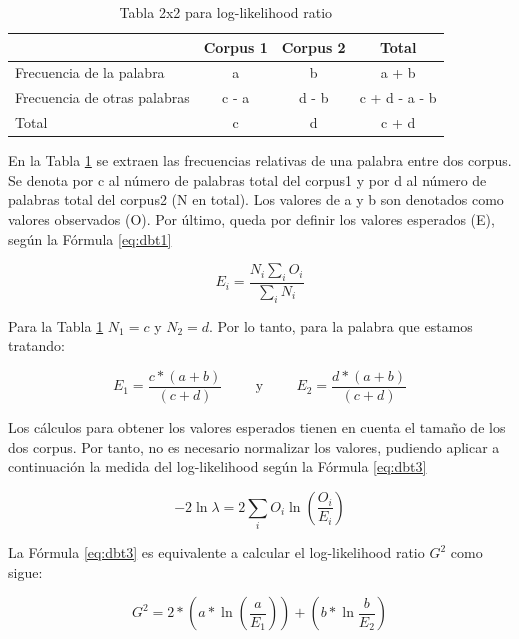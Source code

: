 \begin{table}
  \centering
  \begin{tabular}{|l|c|c|c|}
    \hline
     & Corpus 1 & Corpus 2 & Total \\
    \hline
    Frecuencia de la palabra & a & b & a + b \\
    \hline
    Frecuencia de otras palabras & c - a & d - b & c + d - a - b \\
    \hline
    Total & c & d & c + d \\
    \hline
  \end{tabular}
  \caption{Tabla 2x2 para log-likelihood ratio \cite{012}}
  \label{tab:log_likelihood}
\end{table}

En la Tabla \ref{tab:log_likelihood} se extraen las frecuencias relativas de una palabra entre dos corpus. Se denota por c al número de palabras total del corpus1 y por d al número de palabras total del corpus2 (N en total). Los valores de a y b son denotados como valores observados (O). Por último, queda por definir los valores esperados (E), según la Fórmula \ref{eq:dbt1}

\begin{equation}
  E_i=\frac{N_i\displaystyle\sum_{i}^{} O_i}{\displaystyle\sum_{i}^{} N_i}
  \label{eq:dbt1}
\end{equation}

Para la Tabla \ref{tab:log_likelihood} $N_1 = c$ y $N_2 = d$. Por lo tanto, para la palabra que estamos tratando:

\begin{equation}
  E_1=\frac{c*(a+b)}{(c+d)}\hspace{1cm} \text{y}\hspace{1cm} E_2=\frac{d*(a+b)}{(c+d)}
  \label{eq:dbt2}
\end{equation}

Los cálculos para obtener los valores esperados tienen en cuenta el tamaño de los dos corpus. Por tanto, no es necesario normalizar los valores, pudiendo aplicar a continuación la medida del log-likelihood según la Fórmula \ref{eq:dbt3}

\begin{equation}
  -2\ln\lambda=2\displaystyle\sum_{i}^{} O_i\ln \left(\frac{O_i}{E_i}\right)
  \label{eq:dbt3}
\end{equation}

La Fórmula \ref{eq:dbt3} es equivalente a calcular el log-likelihood ratio $G^2$ como sigue:

\begin{equation}
  G^2=2*\left(a*\ln \left(\frac{a}{E_1}\right)\right)+\left(b*\ln \frac{b}{E_2}\right)
  \label{eq:dbt4}
\end{equation}

